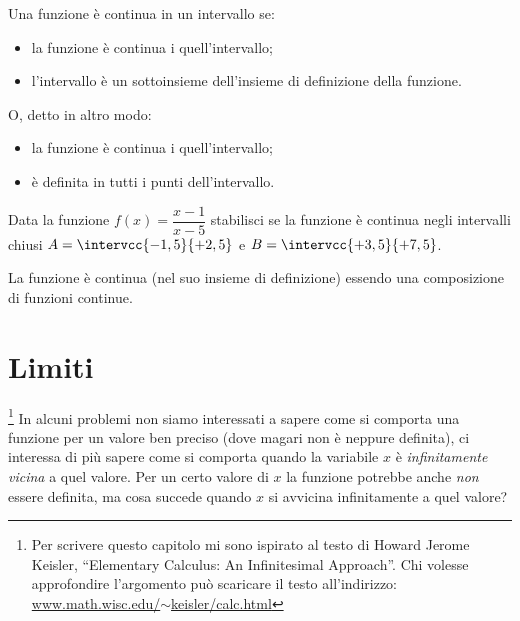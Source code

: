 \begin{definizione}
Una funzione è continua in un intervallo se:
\begin{itemize} [noitemsep]
\item 
la funzione è continua i quell'intervallo;
\item 
l'intervallo è un sottoinsieme dell'insieme di definizione della funzione.
\end{itemize}
O, detto in altro modo: 
\begin{itemize} [noitemsep]
\item 
la funzione è continua i quell'intervallo;
\item 
è definita in tutti i punti dell'intervallo.
\end{itemize}
\end{definizione}

\begin{esempio}
Data la funzione \(f(x) = \dfrac{x-1}{x-5}\) stabilisci se la funzione è 
continua negli intervalli chiusi \(A=\intervcc{-1,5}{+2,5}\) e 
\(B=\intervcc{+3,5}{+7,5}\).

La funzione è continua (nel suo insieme di definizione) essendo una 
composizione di funzioni continue.

\end{esempio}


\section{Limiti}
\label{sec:cont_limiti}

\footnote{Per scrivere questo capitolo mi sono ispirato 
al testo di Howard Jerome Keisler, 
``Elementary Calculus: An Infinitesimal Approach''. 
Chi volesse approfondire l'argomento può scaricare il testo all'indirizzo: 
\href{https://www.math.wisc.edu/~keisler/calc.html}
     {www.math.wisc.edu/\(\sim\)keisler/calc.html}}
In alcuni problemi non siamo interessati a sapere come si comporta una 
funzione per un valore ben preciso (dove magari non è neppure definita), ci 
interessa di più sapere come si comporta quando la variabile \(x\) è 
\emph{infinitamente vicina} a quel valore.
Per un certo valore di \(x\) la funzione potrebbe anche \emph{non} essere 
definita, ma cosa succede quando \(x\) si avvicina infinitamente a quel 
valore?

